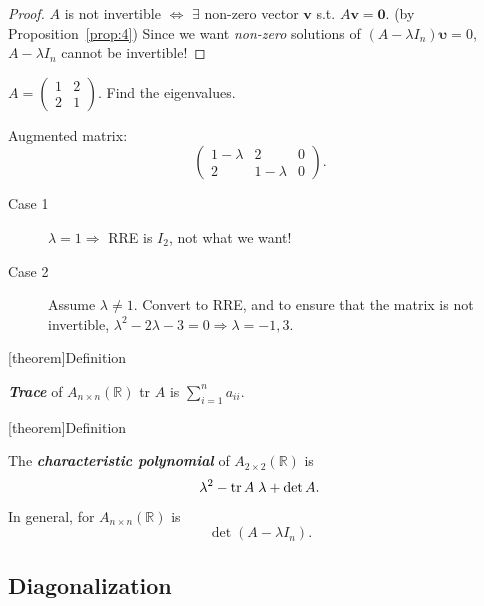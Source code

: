 \documentclass[12pt]{report}
\theoremstyle{definition}
\begin{document}
\begin{proof}
    $A$ is not invertible $\iff$ $\exists$ non-zero vector $\mathbf{v}$ 
    s.t. $A\mathbf{v} = \mathbf{0}$. (by Proposition~\ref{prop:4})
    Since we want \emph{non-zero} solutions of $(A - \lambda I_n)\mathbf{\upsilon} = 0$,
    $A - \lambda I_n$ cannot be invertible!
\end{proof}

\begin{ex}
    $A = \begin{pmatrix}
        1 & 2\\
        2 & 1
    \end{pmatrix}$. Find the eigenvalues.

    Augmented matrix:\[
        \begin{pmatrix}
            1 - \lambda & 2 & 0 \\
            2 & 1 - \lambda & 0
        \end{pmatrix}.
    \]
    \begin{description}
        \item[Case 1] $\lambda = 1 \Rightarrow{}$ RRE is $I_2$, not what we want!
        \item[Case 2] Assume $\lambda \neq 1$. Convert to RRE,
            and to ensure that the matrix is not invertible,
            $\lambda^{2} - 2\lambda - 3 = 0 \Rightarrow{} \lambda = -1, 3$.
    \end{description}
\end{ex}

[theorem]{Definition}
\begin{trace of A}
    \textbf{\emph{Trace}} of $A_{n\times n}(\mathbb{R})$ tr $A$ is $\sum_{i=1}^{n} a_{ii}$.
\end{trace of A}

[theorem]{Definition}
\begin{characteristic polynomial}
    The \textbf{\emph{characteristic polynomial}} of $A_{2\times 2}(\mathbb{R})$ is\[
        \lambda^{2} - \textnormal{tr}\,A\;\lambda + \det{A}.
    \]In general, for $A_{n\times n}(\mathbb{R})$ is\[
    \det{(A - \lambda I_n)}.
    \]
\end{characteristic polynomial}

\subsection{Diagonalization}
\end{document}
